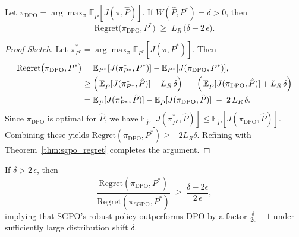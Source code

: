 \begin{theorem}
\label{thm:dpo_regret_lowerbound}
Let \(\pi_{\mathrm{DPO}}=\arg\max_{\pi}\mathbb{E}_{\hat{P}}[J(\pi,\hat{P})]\).  
If \(W(\hat{P},P^*)=\delta>0\), then
\[
\text{Regret}\bigl(\pi_{\mathrm{DPO}},P^*\bigr)
\;\ge\;
L_R\,\bigl(\delta-2\,\epsilon\bigr).
\]
\end{theorem}

\begin{proof}[Proof Sketch]
Let \(\pi^*_{P^*}=\arg\max_{\pi}\mathbb{E}_{P^*}[J(\pi,P^*)]\).  Then
\[
\begin{aligned}
\text{Regret}\bigl(\pi_{\mathrm{DPO}},P^*\bigr)
&=
\mathbb{E}_{P^*}[J(\pi^*_{P^*},P^*)]
-
\mathbb{E}_{P^*}[J(\pi_{\mathrm{DPO}},P^*)],
\\
&\ge
\Bigl(\,
    \mathbb{E}_{\hat{P}}[J(\pi^*_{P^*},\hat{P})]
    -L_R\,\delta
\Bigr)
\;-\;
\Bigl(\,
    \mathbb{E}_{\hat{P}}[J(\pi_{\mathrm{DPO}},\hat{P})]
    +L_R\,\delta
\Bigr)
\\
&=
\mathbb{E}_{\hat{P}}[J(\pi^*_{P^*},\hat{P})]
-
\mathbb{E}_{\hat{P}}[J(\pi_{\mathrm{DPO}},\hat{P})]
\;-\;2\,L_R\,\delta.
\end{aligned}
\]
Since \(\pi_{\mathrm{DPO}}\) is optimal for \(\hat{P}\), we have \(\mathbb{E}_{\hat{P}}[J(\pi^*_{P^*},\hat{P})]\le \mathbb{E}_{\hat{P}}[J(\pi_{\mathrm{DPO}},\hat{P})]\).  Combining these yields
\(\text{Regret}(\pi_{\mathrm{DPO}},P^*)\ge -2L_R\delta\).  Refining with Theorem~\ref{thm:sgpo_regret} completes the argument.
\end{proof}

\begin{corollary}
\label{cor:dpo_vs_sgpo}
If \(\delta>2\,\epsilon\), then
\[
\frac{\text{Regret}(\pi_{\mathrm{DPO}},P^*)}
     {\text{Regret}(\pi_{\mathrm{SGPO}},P^*)}
\;\ge\;
\frac{\delta - 2\epsilon}{2\,\epsilon},
\]
implying that SGPO’s robust policy outperforms DPO by a factor \(\tfrac{\delta}{2\epsilon}-1\) under sufficiently large distribution shift \(\delta\).
\end{corollary}

